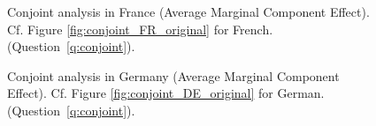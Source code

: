 \begin{figure}[h!]
    \caption[Conjoint analysis in France]{Conjoint analysis in France (Average Marginal Component Effect). Cf. Figure \ref{fig:conjoint_FR_original} for French. \hfill (Question~\ref{q:conjoint}).
    }\label{fig:conjoint_FR}
\end{figure}

\begin{figure}[h!]
    \caption[Conjoint analysis in Germany]{Conjoint analysis in Germany (Average Marginal Component Effect). Cf. Figure \ref{fig:conjoint_DE_original} for German. \hfill (Question~\ref{q:conjoint}).
    }\label{fig:conjoint_DE}
\end{figure}

